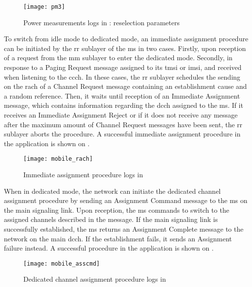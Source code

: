       \begin{figure}
        \centering
        \texttt{[image: pm3]}
        \caption{Power measurements logs in : reselection
        parameters}
        \label{fig:pm3}
      \end{figure}

    To switch from idle mode to dedicated mode, an immediate assignment
    procedure can be initiated by the \gls{rr} sublayer of the \gls{ms}
    in two cases. Firstly, upon reception of a request from the \gls{mm}
    sublayer to enter the dedicated mode. Secondly, in response to a
    Paging Request message assigned to its \gls{tmsi} or \gls{imsi}, and
    received when listening to the \gls{ccch}. In these cases, the
    \gls{rr} sublayer schedules the sending on the \gls{rach} of a
    Channel Request message containing an establishment cause and a
    random reference. Then, it waits until reception of an Immediate
    Assignment message, which contains information regarding the
    \gls{dcch} assigned to the \gls{ms}. If it receives an Immediate
    Assignment Reject or if it does not receive any message after the
    maximum amount of Channel Request messages have been sent, the
    \gls{rr} sublayer aborts the procedure. A successful immediate
    assignment procedure in the  application is shown on
    .

      \begin{figure}
        \centering
        \texttt{[image: mobile\_rach]}
        \caption{Immediate assignment procedure logs in }
        \label{fig:mobile_rach}
      \end{figure}

    When in dedicated mode, the network can initiate the dedicated
    channel assignment procedure by sending an Assignment Command
    message to the \gls{ms} on the main signaling link. Upon reception,
    the \gls{ms} commands to switch to the assigned channels described
    in the message. If the main signaling link is successfully
    established, the \gls{ms} returns an Assignment Complete message to
    the network on the main \gls{dcch}. If the establishment fails, it
    sends an Assignment failure instead. A successful procedure in the
     application is shown on .

      \begin{figure}
        \centering
        \texttt{[image: mobile\_asscmd]}
        \caption{Dedicated channel assignment procedure logs in }
        \label{fig:mobile_asscmd}
      \end{figure}

